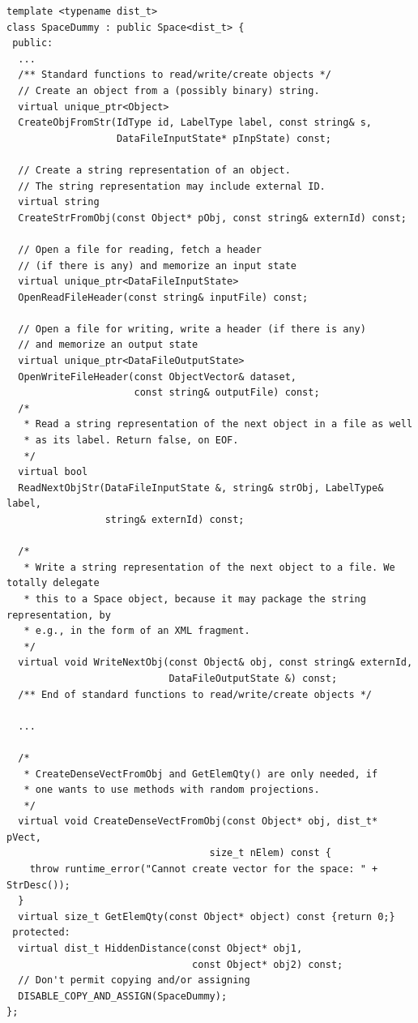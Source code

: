 \documentclass[runningheads,a4paper]{llncs}
\begin{document}
\begin{table}[[!htbp]
\caption{\label{FigDummySpace}A sample space class}
\begin{verbatim}
template <typename dist_t>
class SpaceDummy : public Space<dist_t> {
 public:
  ...
  /** Standard functions to read/write/create objects */ 
  // Create an object from a (possibly binary) string.
  virtual unique_ptr<Object> 
  CreateObjFromStr(IdType id, LabelType label, const string& s,
                   DataFileInputState* pInpState) const;

  // Create a string representation of an object.
  // The string representation may include external ID.
  virtual string 
  CreateStrFromObj(const Object* pObj, const string& externId) const;

  // Open a file for reading, fetch a header 
  // (if there is any) and memorize an input state
  virtual unique_ptr<DataFileInputState> 
  OpenReadFileHeader(const string& inputFile) const;

  // Open a file for writing, write a header (if there is any) 
  // and memorize an output state
  virtual unique_ptr<DataFileOutputState> 
  OpenWriteFileHeader(const ObjectVector& dataset,
                      const string& outputFile) const;
  /*
   * Read a string representation of the next object in a file as well
   * as its label. Return false, on EOF.
   */
  virtual bool 
  ReadNextObjStr(DataFileInputState &, string& strObj, LabelType& label, 
                 string& externId) const;

  /* 
   * Write a string representation of the next object to a file. We totally delegate
   * this to a Space object, because it may package the string representation, by
   * e.g., in the form of an XML fragment.
   */
  virtual void WriteNextObj(const Object& obj, const string& externId, 
                            DataFileOutputState &) const;
  /** End of standard functions to read/write/create objects */ 

  ...

  /*
   * CreateDenseVectFromObj and GetElemQty() are only needed, if
   * one wants to use methods with random projections.
   */
  virtual void CreateDenseVectFromObj(const Object* obj, dist_t* pVect,
                                   size_t nElem) const {
    throw runtime_error("Cannot create vector for the space: " + StrDesc());
  }
  virtual size_t GetElemQty(const Object* object) const {return 0;}
 protected:
  virtual dist_t HiddenDistance(const Object* obj1, 
                                const Object* obj2) const;
  // Don't permit copying and/or assigning 
  DISABLE_COPY_AND_ASSIGN(SpaceDummy);
};
\end{verbatim}
\end{table}
\end{document}
